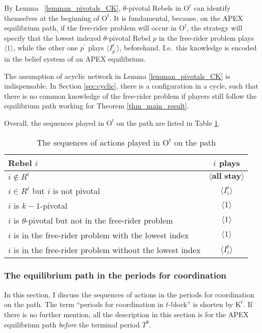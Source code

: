 \documentclass[12pt,letter]{article}
\newcommand{\Kappa}{\mathrm{K}}
\newcommand{\Omicron}{\mathrm{O}}
\theoremstyle{definition}
\theoremstyle{remark}
\theoremstyle{claim}
\begin{document}
By Lemma ~\ref{lemman_pivotals_CK}, $\theta$-pivotal Rebels in $\Omicron^t$ can identify themselves at the beginning of $\Omicron^t$. It is fundamental, because, on the APEX equilibrium path, if the free-rider problem will occur in $\Omicron^t$, the strategy will specify that the lowest indexed $\theta$-pivotal Rebel $p$ in the free-rider problem plays $\langle 1 \rangle$, while the other one $p^{'}$ plays $\langle I^t_{p^{'}} \rangle$, beforehand. I.e.~this knowledge is encoded in the belief system of an APEX equilibrium.

The assumption of acyclic network in Lemma \ref{lemman_pivotals_CK} is indispensable. In Section \ref{sec:cyclic}, there is a configuration in a cycle, such that there is no common knowledge of the free-rider problem if players still follow the equilibrium path working for Theorem \ref{thm_main_result}. 

Overall, the sequences played in $\Omicron^t$ on the path are listed in Table \ref{Table_msg_RP_path}.

\begin{table}[!htbp]
\caption{The sequences of actions played in $\Omicron^t$ on the path}
\label{Table_msg_RP_path}
\begin{center}
\begin{tabular}{l c}
Rebel $i$ & $i$ plays\\
\hline
\hline
$i\notin R^t$				& $\langle \textbf{all stay} \rangle$  \\
$i\in R^t$ but $i$ is not pivotal	 					 			& $\langle I^t_i \rangle$  \\
$i$ is $k-1$-pivotal	 					 			& $\langle 1 \rangle$  \\
$i$ is $\theta$-pivotal but not in the free-rider problem	 					 			& $\langle 1 \rangle$  \\
$i$ is in the free-rider problem with the lowest index	 					 			& $\langle 1 \rangle$  \\
$i$ is in the free-rider problem without the lowest index	 					 			& $\langle I^t_i \rangle$  \\
\hline
\end{tabular}
\end{center}
\end{table}


\subsubsection{The equilibrium path in the periods for coordination}
\label{sec:eq_cd}
In this section, I discuss the sequences of actions in the periods for coordination on the path. The term ``periods for coordination in $t$-block'' is shorten by $\Kappa^{t}$. If there is no further mention, all the description in this section is for the APEX equilibrium path \textit{before} the terminal period $T^{\theta}$. 
\end{document}
